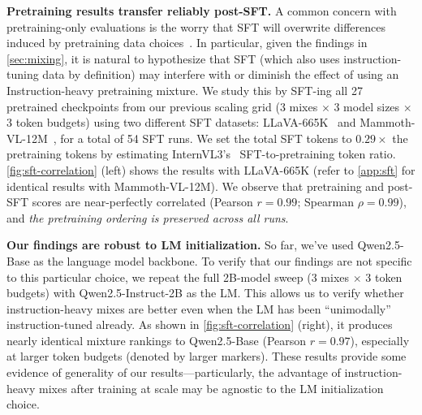 \textbf{Pretraining results transfer reliably post-SFT.} A common concern with pretraining-only evaluations is the worry that SFT will overwrite differences induced by pretraining data choices~\citep{kumar2022fine}. 
In particular, given the findings in \cref{sec:mixing}, it is natural to hypothesize that SFT (which also uses instruction-tuning data by definition) may interfere with or diminish the effect of using an Instruction-heavy pretraining mixture. %
We study this by SFT-ing all 27 pretrained checkpoints from our previous scaling grid (3 mixes $\times$ 3 model sizes $\times$ 3 token budgets) using two different SFT datasets: LLaVA-665K~\citep{liu2023visual} and Mammoth-VL-12M~\citep{guo2025mammoth}, for a total of 54 SFT runs.
We set the total SFT tokens to $0.29\times$ the pretraining tokens by estimating InternVL3's~\citep{zhu2025internvl3} SFT-to-pretraining token ratio.
 \cref{fig:sft-correlation} (left) shows the results with LLaVA-665K (refer to \textcolor{black}{\cref{app:sft}} for identical results with Mammoth-VL-12M).
 We observe that pretraining and post-SFT scores are near-perfectly correlated (Pearson ${r}{=}{0.99}$; Spearman ${\rho}{=}{0.99}$), 
and \textit{the pretraining ordering is preserved across all runs}.


 

\textbf{Our findings are robust to LM initialization.}
So far, we've used Qwen2.5-Base as the language model backbone. 
To verify that our findings are not specific to this particular choice, we repeat the full 2B-model sweep (3 mixes $\times$ 3 token budgets) with Qwen2.5-Instruct-2B as the LM.
This allows us to verify whether instruction-heavy mixes are better even when the LM has been ``unimodally'' instruction-tuned already. 
As shown in \cref{fig:sft-correlation} (right), it produces nearly identical mixture rankings to Qwen2.5-Base (Pearson $r{=}0.97$), especially at larger token budgets (denoted by larger markers). 
These results provide some evidence of generality of our results---particularly, the advantage of instruction-heavy mixes after training at scale may be agnostic to the LM initialization choice.








































